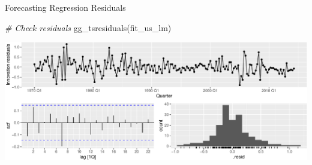 \documentclass[
  ignorenonframetext,
]{beamer}
\newenvironment{Shaded}{\begin{snugshade}}{\end{snugshade}}
\newcommand{\CommentTok}[1]{\textcolor[rgb]{0.56,0.35,0.01}{\textit{#1}}}
\newcommand{\FunctionTok}[1]{\textcolor[rgb]{0.00,0.00,0.00}{#1}}
\newcommand{\NormalTok}[1]{#1}
\begin{document}
\begin{frame}[fragile]{Forecasting \textbar{} \small Regression
Residuals}
\protect\hypertarget{forecasting-regression-residuals}{}
\footnotesize

\normalfont

\footnotesize

\begin{Shaded}
\begin{Highlighting}[]
\CommentTok{\# Check residuals}
\FunctionTok{gg\_tsresiduals}\NormalTok{(fit\_us\_lm)}
\end{Highlighting}
\end{Shaded}

\includegraphics{Time-series-regression-models_files/figure-beamer/unnamed-chunk-26-1.pdf}

\normalfont
\end{frame}
\end{document}
